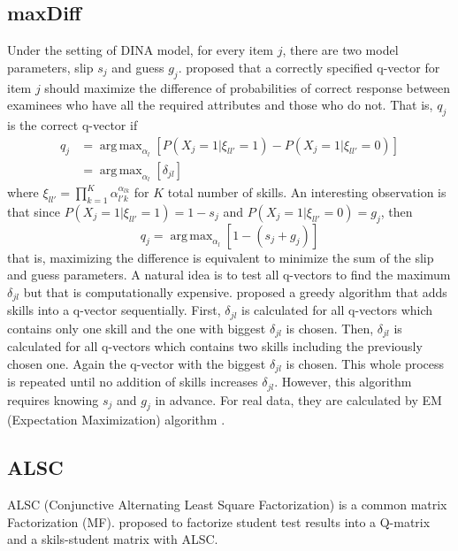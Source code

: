 \documentclass{edm_template}
\DeclareMathOperator*{\argmax}{arg\,max}
\begin{document}
\subsection{maxDiff}
Under the setting of DINA model, for every item $j$, there are two model parameters, slip $s_j$ and guess $g_j$.  proposed that a correctly specified q-vector for item $j$ should maximize the difference of probabilities of correct response between examinees who have all the required attributes and those who do not. That is, $q_j$ is the correct q-vector if
\begin{equation} 
\begin{split}
q_j & =\argmax_{\alpha _l}[P(X_j=1|\xi_{ll'}=1)-P(X_j=1|\xi_{ll'}=0)]
\\
& =\argmax_{\alpha _l}[\delta_{jl}]
\end{split}
\end{equation}
where $\xi_{ll'}=\prod_{k=1}^{K}\alpha_{l'k}^{\alpha_{lk}}$ for $K$ total number of skills. An interesting observation is that since $P(X_j=1|\xi_{ll'}=1)=1-s_j$ and $P(X_j=1|\xi_{ll'}=0)=g_j$, then $$q_j=\argmax_{\alpha _l}[1-(s_j+g_j)]$$ 
that is, maximizing the difference is equivalent to minimize the sum of the slip and guess parameters. A natural idea is to test all q-vectors to find the maximum $\delta_{jl}$ but that is computationally expensive.  proposed a greedy algorithm that adds skills into a q-vector sequentially. First, $\delta_{jl}$ is calculated for all q-vectors which contains only one skill and the one with biggest $\delta_{jl}$ is chosen. Then, $\delta_{jl}$ is calculated for all q-vectors which contains two skills including the previously chosen one. Again the q-vector with the biggest $\delta_{jl}$ is chosen. This whole process is repeated until no addition of skills increases $\delta_{jl}$. However, this algorithm requires knowing $s_j$ and $g_j$ in advance. For real data, they are calculated by EM (Expectation Maximization) algorithm \cite{de2009dina}.  

\subsection{ALSC}
ALSC (Conjunctive Alternating Least Square Factorization) is a common matrix Factorization (MF).  proposed to factorize student test results into a Q-matrix and a skils-student matrix with ALSC. 
\end{document}
